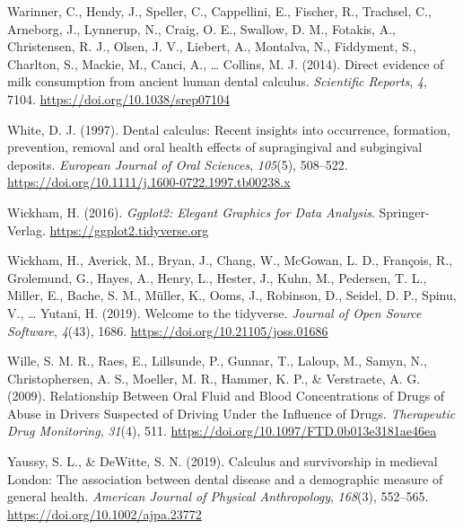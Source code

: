 \documentclass[
]{article}
\newlength{\cslhangindent}
\newlength{\cslentryspacingunit} %
\newenvironment{CSLReferences}[2] %
 {%
  \setlength{\parindent}{0pt}
  \ifodd #1
  \let\oldpar\par
  \def\par{\hangindent=\cslhangindent\oldpar}
  \fi
  \setlength{\parskip}{#2\cslentryspacingunit}
 }%
 {}
\begin{document}
\begin{CSLReferences}{1}{0}
\leavevmode{}%
Warinner, C., Hendy, J., Speller, C., Cappellini, E., Fischer, R.,
Trachsel, C., Arneborg, J., Lynnerup, N., Craig, O. E., Swallow, D. M.,
Fotakis, A., Christensen, R. J., Olsen, J. V., Liebert, A., Montalva,
N., Fiddyment, S., Charlton, S., Mackie, M., Canci, A., \ldots{}
Collins, M. J. (2014). Direct evidence of milk consumption from ancient
human dental calculus. \emph{Scientific Reports}, \emph{4}, 7104.
\url{https://doi.org/10.1038/srep07104}

\leavevmode{}%
White, D. J. (1997). Dental calculus: Recent insights into occurrence,
formation, prevention, removal and oral health effects of supragingival
and subgingival deposits. \emph{European Journal of Oral Sciences},
\emph{105}(5), 508--522.
\url{https://doi.org/10.1111/j.1600-0722.1997.tb00238.x}

\leavevmode{}%
Wickham, H. (2016). \emph{Ggplot2: {Elegant Graphics} for {Data
Analysis}}. {Springer-Verlag}. \url{https://ggplot2.tidyverse.org}

\leavevmode{}%
Wickham, H., Averick, M., Bryan, J., Chang, W., McGowan, L. D.,
François, R., Grolemund, G., Hayes, A., Henry, L., Hester, J., Kuhn, M.,
Pedersen, T. L., Miller, E., Bache, S. M., Müller, K., Ooms, J.,
Robinson, D., Seidel, D. P., Spinu, V., \ldots{} Yutani, H. (2019).
Welcome to the {tidyverse}. \emph{Journal of Open Source Software},
\emph{4}(43), 1686. \url{https://doi.org/10.21105/joss.01686}

\leavevmode{}%
Wille, S. M. R., Raes, E., Lillsunde, P., Gunnar, T., Laloup, M., Samyn,
N., Christophersen, A. S., Moeller, M. R., Hammer, K. P., \& Verstraete,
A. G. (2009). Relationship {Between Oral Fluid} and {Blood
Concentrations} of {Drugs} of {Abuse} in {Drivers Suspected} of {Driving
Under} the {Influence} of {Drugs}. \emph{Therapeutic Drug Monitoring},
\emph{31}(4), 511. \url{https://doi.org/10.1097/FTD.0b013e3181ae46ea}

\leavevmode{}%
Yaussy, S. L., \& DeWitte, S. N. (2019). Calculus and survivorship in
medieval {London}: {The} association between dental disease and a
demographic measure of general health. \emph{American Journal of
Physical Anthropology}, \emph{168}(3), 552--565.
\url{https://doi.org/10.1002/ajpa.23772}


\end{CSLReferences}
\end{document}
